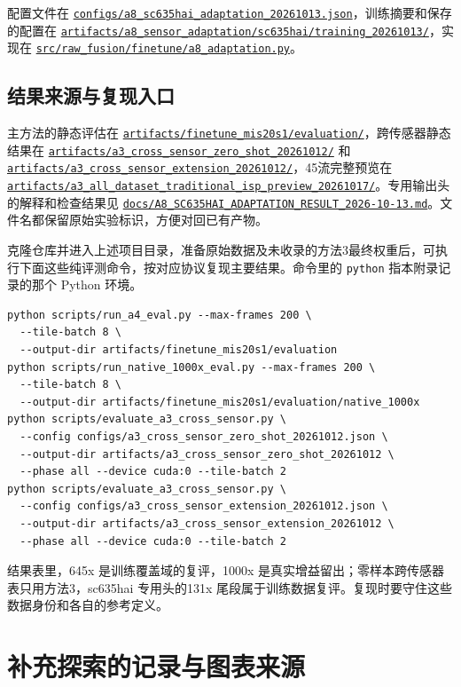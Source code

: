 \documentclass[11pt,a4paper,UTF8,fontset=fandol]{ctexart}
\newcommand{\repofile}[1]{\href{https://github.com/JingZe-Liang/SigmaStar_AIISP/blob/main/Stage2/9_19-10_1/Task3/XWJ/RECOVERED_Stage2_DenoiseModel_20261010/#1}{\nolinkurl{#1}}}
\newcommand{\repodir}[1]{\href{https://github.com/JingZe-Liang/SigmaStar_AIISP/tree/main/Stage2/9_19-10_1/Task3/XWJ/RECOVERED_Stage2_DenoiseModel_20261010/#1}{\nolinkurl{#1}}}
\begin{document}
配置文件在 \repofile{configs/a8_sc635hai_adaptation_20261013.json}，训练摘要和保存的配置在 \repodir{artifacts/a8_sensor_adaptation/sc635hai/training_20261013/}，实现在 \repofile{src/raw_fusion/finetune/a8_adaptation.py}。

\subsection{结果来源与复现入口}

主方法的静态评估在 \repodir{artifacts/finetune_mis20s1/evaluation/}，跨传感器静态结果在 \repodir{artifacts/a3_cross_sensor_zero_shot_20261012/} 和 \repodir{artifacts/a3_cross_sensor_extension_20261012/}，45流完整预览在 \repodir{artifacts/a3_all_dataset_traditional_isp_preview_20261017/}。专用输出头的解释和检查结果见 \repofile{docs/A8_SC635HAI_ADAPTATION_RESULT_2026-10-13.md}。文件名都保留原始实验标识，方便对回已有产物。

克隆仓库并进入上述项目目录，准备原始数据及未收录的方法3最终权重后，可执行下面这些纯评测命令，按对应协议复现主要结果。命令里的 \texttt{python} 指本附录记录的那个 Python 环境。

{\small
\begin{verbatim}
python scripts/run_a4_eval.py --max-frames 200 \
  --tile-batch 8 \
  --output-dir artifacts/finetune_mis20s1/evaluation
python scripts/run_native_1000x_eval.py --max-frames 200 \
  --tile-batch 8 \
  --output-dir artifacts/finetune_mis20s1/evaluation/native_1000x
python scripts/evaluate_a3_cross_sensor.py \
  --config configs/a3_cross_sensor_zero_shot_20261012.json \
  --output-dir artifacts/a3_cross_sensor_zero_shot_20261012 \
  --phase all --device cuda:0 --tile-batch 2
python scripts/evaluate_a3_cross_sensor.py \
  --config configs/a3_cross_sensor_extension_20261012.json \
  --output-dir artifacts/a3_cross_sensor_extension_20261012 \
  --phase all --device cuda:0 --tile-batch 2
\end{verbatim}
}

结果表里，645x 是训练覆盖域的复评，1000x 是真实增益留出；零样本跨传感器表只用方法3，sc635hai 专用头的131x 尾段属于训练数据复评。复现时要守住这些数据身份和各自的参考定义。

\section{补充探索的记录与图表来源}
\label{app:djc_sources}
\end{document}
